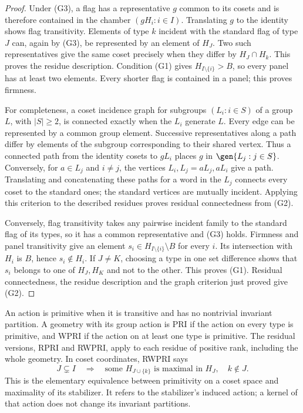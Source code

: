 \begin{proof}
Under (G3), a flag has a representative $g$ common to its cosets and is
therefore contained in the chamber $(gH_i:i\in I)$. Translating $g$ to
the identity shows flag transitivity. Elements of type $k$ incident with
the standard flag of type $J$ can, again by (G3), be represented by an
element of $H_J$. Two such representatives give the same coset precisely
when they differ by $H_J\cap H_k$. This proves the residue description.
Condition (G1) gives $H_{I\setminus\{i\}}>B$, so every panel has at least
two elements. Every shorter flag is contained in a panel; this proves
firmness.

For completeness, a coset incidence graph for subgroups $(L_i:i\in S)$
of a group $L$, with $|S|\geq2$, is connected exactly when the $L_i$
generate $L$. Every edge can be represented by a common group element.
Successive representatives along a path differ by elements of the
subgroup corresponding to their shared vertex. Thus a connected path
from the identity cosets to $gL_i$ places $g$ in $\gen{L_j:j\in S}$.
Conversely, for $a\in L_j$ and $i\ne j$, the vertices
$L_i,L_j=aL_j,aL_i$ give a path. Translating and concatenating these
paths for a word in the $L_j$ connects every coset to the standard ones;
the standard vertices are mutually incident. Applying this criterion
to the described residues proves residual connectedness from (G2).

Conversely, flag transitivity takes any pairwise incident family to the
standard flag of its types, so it has a common representative and (G3)
holds. Firmness and panel transitivity give an element
$s_i\in H_{I\setminus\{i\}}\setminus B$ for every $i$. Its intersection
with $H_i$ is $B$, hence $s_i\notin H_i$. If $J\ne K$, choosing a type
in one set difference shows that $s_i$ belongs to one of $H_J,H_K$ and
not to the other. This proves (G1). Residual connectedness, the residue
description and the graph criterion just proved give (G2).
\end{proof}

An action is primitive when it is transitive and has no nontrivial
invariant partition. A geometry with its group action is PRI if the
action on every type is primitive, and WPRI if the action on at least
one type is primitive. The residual versions, RPRI and RWPRI, apply
to each residue of positive rank, including the whole geometry. In coset
coordinates, RWPRI says
\[
\tag{G4}
J\subsetneq I\quad\Longrightarrow\quad
\text{some }H_{J\cup\{k\}}\text{ is maximal in }H_J,
\quad k\notin J.
\]
This is the elementary equivalence between primitivity on a coset space
and maximality of its stabilizer. It refers to the stabilizer's induced
action; a kernel of that action does not change its invariant partitions.

